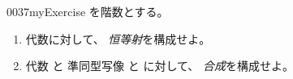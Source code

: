 \documentclass[index]{subfiles}
\begin{document}
\begin{myBlock}{0037}{myExercise}
  を階数とする。
  \begin{enumerate}
  \item \myInlineMath{\myNat}代数に対して、
    \emph{恒等射}を構成せよ。
  \item \myInlineMath{\myNat}代数
    と
    \myInlineMath{\myNat}準同型写像
    と
    に対して、
    \emph{合成}を構成せよ。
  \end{enumerate}
\end{myBlock}
\end{document}
